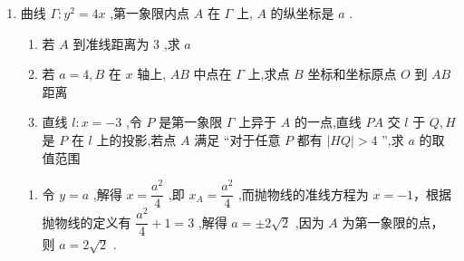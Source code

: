 \begin{enumerate}
\begin{jieda}
\begin{enumerate}
\begin{enumerate}
                综上，$k_{OQ} \in \left[-\dfrac{1}{3}, \dfrac{1}{3}\right]$，最大值为$\dfrac{1}{3}$.

                \item 方法2

                设$Q(x, y)$，则$P(10x-9, 10y)$，代入抛物线方程可得$100y^2 = 4(10x-9)$，故点 $Q$ 的轨迹方程为 $100y^2 = 4(10x-9)$

                当直线 ${OQ}$ 与抛物线 ${y}^{2} = \dfrac{2}{5}x - \dfrac{9}{25}$ 相切时,其斜率 $k$ 取到最值.

                设切点为$(x_0, y_0)$，则该处切线为$100y_0y = 2(10x-9+10x_0-9)$，即$100y_0y = 20x+(20x_0-36)$，根据切线过原点可知$x_0 = \dfrac{9}{5}$，代入切线方程可知$y_0 = \pm \dfrac{3}{5}$，故切线为$y = \pm \dfrac{1}{3}x$，故最大值为$\dfrac{1}{3}$.
            \end{enumerate}
        \end{enumerate}
    \end{jieda}
    
    \item 曲线 $\Gamma  : {y}^{2} = {4x}$ ,第一象限内点 $A$ 在 $\Gamma$ 上, $A$ 的纵坐标是 $a$ .
    \begin{enumerate}
        \item 若 $A$ 到准线距离为 3 ,求 $a$
        \item 若 $a = 4,B$ 在 $x$ 轴上, ${AB}$ 中点在 $\Gamma$ 上,求点 $B$ 坐标和坐标原点 $O$ 到 ${AB}$ 距离
        \item 直线 $l : x =  - 3$ ,令 $P$ 是第一象限 $\Gamma$ 上异于 $A$ 的一点,直线 ${PA}$ 交 $l$ 于 $Q,H$ 是 $P$ 在 $l$ 上的投影,若点 $A$ 满足 “对于任意 $P$ 都有 $\left| {HQ}\right|  > 4$ ”,求 $a$ 的取值范围
    \end{enumerate}
    \begin{jieda}
        \begin{enumerate}
            \item 令 $y = a$ ,解得 $x = \dfrac{{a}^{2}}{4}$ ,即 ${x}_{A} = \dfrac{{a}^{2}}{4}$ ,而抛物线的准线方程为 $x =  - 1$，根据抛物线的定义有 $\dfrac{{a}^{2}}{4} + 1 = 3$ ,解得 $a =  \pm  2\sqrt{2}$ ,因为 $A$ 为第一象限的点，则 $a = 2\sqrt{2}$ .
            

\end{enumerate}
\end{jieda}
\end{enumerate}
